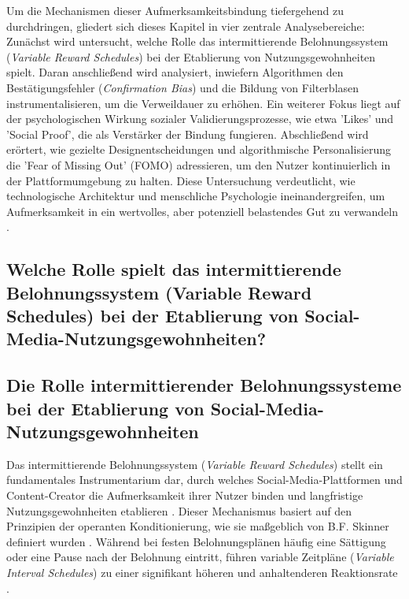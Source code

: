 \documentclass[11pt,a4paper]{article}
\begin{document}
Um die Mechanismen dieser Aufmerksamkeitsbindung tiefergehend zu durchdringen, gliedert sich dieses Kapitel in vier zentrale Analysebereiche: Zunächst wird untersucht, welche Rolle das intermittierende Belohnungssystem (\textit{Variable Reward Schedules}) bei der Etablierung von Nutzungsgewohnheiten spielt. Daran anschließend wird analysiert, inwiefern Algorithmen den Bestätigungsfehler (\textit{Confirmation Bias}) und die Bildung von Filterblasen instrumentalisieren, um die Verweildauer zu erhöhen. Ein weiterer Fokus liegt auf der psychologischen Wirkung sozialer Validierungsprozesse, wie etwa 'Likes' und 'Social Proof', die als Verstärker der Bindung fungieren. Abschließend wird erörtert, wie gezielte Designentscheidungen und algorithmische Personalisierung die 'Fear of Missing Out' (FOMO) adressieren, um den Nutzer kontinuierlich in der Plattformumgebung zu halten. Diese Untersuchung verdeutlicht, wie technologische Architektur und menschliche Psychologie ineinandergreifen, um Aufmerksamkeit in ein wertvolles, aber potenziell belastendes Gut zu verwandeln \autocite{doaj_14e0a3497c8942b191341755c1ab87e8,crossref_10_3389_fpsyg_2026_1840700}.

\subsection{Welche Rolle spielt das intermittierende Belohnungssystem (Variable Reward Schedules) bei der Etablierung von Social-Media-Nutzungsgewohnheiten?}

\subsection{Die Rolle intermittierender Belohnungssysteme bei der Etablierung von Social-Media-Nutzungsgewohnheiten}

Das intermittierende Belohnungssystem (\textit{Variable Reward Schedules}) stellt ein fundamentales Instrumentarium dar, durch welches Social-Media-Plattformen und Content-Creator die Aufmerksamkeit ihrer Nutzer binden und langfristige Nutzungsgewohnheiten etablieren \autocite{grey_grey_4c892db242a44cb8abe31d8c24b9adf6}. Dieser Mechanismus basiert auf den Prinzipien der operanten Konditionierung, wie sie maßgeblich von B.F. Skinner definiert wurden \autocite{grey_grey_4c892db242a44cb8abe31d8c24b9adf6}. Während bei festen Belohnungsplänen häufig eine Sättigung oder eine Pause nach der Belohnung eintritt, führen variable Zeitpläne (\textit{Variable Interval Schedules}) zu einer signifikant höheren und anhaltenderen Reaktionsrate \autocite{grey_grey_4c892db242a44cb8abe31d8c24b9adf6}.
\end{document}
